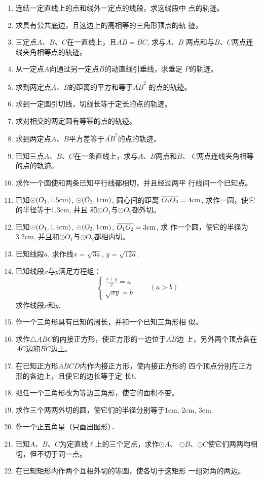 \begin{enumerate}
    \item 连结一定直线上的点和线外一定点的线段，求这线段中
    点的轨迹。
    \item 求具有公共底边，且这边上的高相等的三角形顶点的轨
    迹。
    \item 三定点$A$、$B$、$C$在一直线上，且$\overline{AB}=\overline{BC}$, 求与$A$、$B$
    两点和与$B$、$C$两点连线夹角相等点的轨迹。
    \item 从一定点$A$向通过另一定点$B$的动直线引垂线，求垂足
    $P$的轨迹。
    \item 求到两定点$A$、$B$的距离的平方和等于$\overline{AB}^2$
    的点的轨迹。
    \item 求到一定圆引切线，切线长等于定长的点的轨迹。
    \item 求对相交的两定圆有等幂的点的轨迹。
    \item 求到两定点$A$、$B$平方差等于$\overline{AB}^2$的点的轨迹。
    \item 已知三点$A$、$B$、$C$在一条直线上，求与$A$、$B$两点和$B$、
   $ C$两点连线夹角相等的点的轨迹。
    \item 求作一个圆使和两条已知平行线都相切，并且经过两平
    行线间一个已知点。
    \item 已知$\odot(O_1,1.5{\rm cm})$, $\odot(O_2,1{\rm cm})$, 圆心间的距离
    $\overline{O_1O_2}=4{\rm cm}$, 求作一圆，使它的半径等于1.3cm, 并且
    和$\odot O_1$与$\odot O_2$都外切。
    \item 已知$\odot(O_1,1.4{\rm cm})$, $\odot(O_2,1{\rm cm})$, $\overline{O_1O_2}=3{\rm cm}$, 求
    作一个圆，使它的半径为3.2cm, 并且和$\odot O_1$与$\odot O_2$都相内切。
    \item 已知线段$a$, 求作线$x=\sqrt{3a}$, $y=\sqrt{12a}$.
    \item 已知线段$x$与$y$满足方程组：
    \[\begin{cases}
        \frac{x+y}{2}=a\\
        \sqrt{xy}=b
    \end{cases}\qquad (a>b)\]
    求作线段$x$和$y$. 
    \item 作一个三角形具有已知的周长，并和一个已知三角形相
似。
\item 求作$\triangle ABC$的内接正方形，使正方形的一边位于$\overline{AB}$边
上，另外两个顶点各在$\overline{AC}$边和$\overline{BC}$边上。
\item 在已知正方形$ABCD$内作内接正方形，使内接正方形的
四个顶点分别在正方形的各边上，且使它的边长等于定
长$b$.
\item 把任一个三角形改为等边三角形，使它的面积不变。
\item 求作三个两两外切的圆，使它们的半径分别等于1cm,
 2cm, 3cm.
\item 作一个正五角星（只画出图形）．
\item 已知$A$、$B$、$C$为定直线$\ell$上的三个定点，求作$\odot A$、
$\odot B$、$\odot C$使它们两两均相切，但不切于同一点。
\item 在已知矩形内作两个互相外切的等圆，使各切于这矩形
一组对角的两边。
\end{enumerate}
